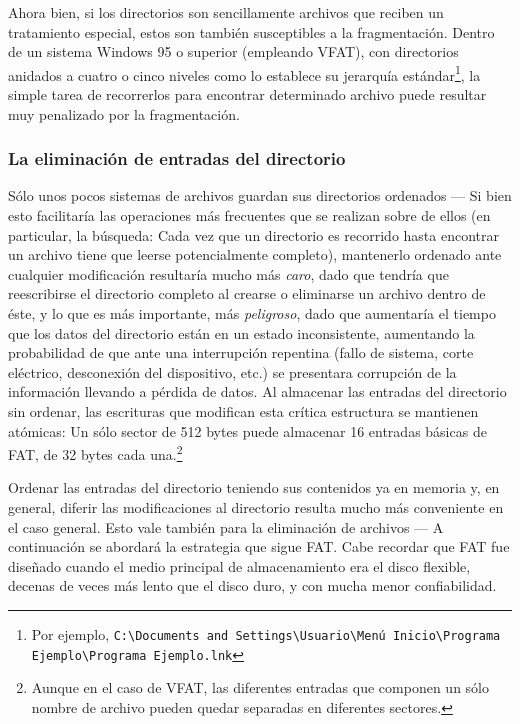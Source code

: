 \documentclass[11pt,fleqn]{book} %
\begin{document}
Ahora bien, si los directorios son sencillamente archivos que reciben
un tratamiento especial, estos son también susceptibles a la
fragmentación. Dentro de un sistema Windows 95 o superior (empleando
VFAT), con directorios anidados a cuatro o cinco niveles como lo
establece su jerarquía estándar\footnote{Por ejemplo, \texttt{C:\textbackslash{}Documents and
Settings\textbackslash{}Usuario\textbackslash{}Menú Inicio\textbackslash{}Programa Ejemplo\textbackslash{}Programa Ejemplo.lnk} },
la simple tarea de recorrerlos para encontrar determinado archivo puede
resultar muy penalizado por la fragmentación.
\subsubsection{La eliminación de entradas del directorio}
\label{sec-7-1-4-3}


Sólo unos pocos sistemas de archivos guardan sus directorios ordenados
— Si bien esto facilitaría las operaciones más frecuentes que se
realizan sobre de ellos (en particular, la búsqueda: Cada vez que un
directorio es recorrido hasta encontrar un archivo tiene que leerse
potencialmente completo), mantenerlo ordenado ante cualquier
modificación resultaría mucho más \emph{caro}, dado que tendría que
reescribirse el directorio completo al crearse o eliminarse un archivo
dentro de éste, y lo que es más importante, más \emph{peligroso}, dado que
aumentaría el tiempo que los datos del directorio están en un estado
inconsistente, aumentando la probabilidad de que ante una interrupción
repentina (fallo de sistema, corte eléctrico, desconexión del
dispositivo, etc.) se presentara corrupción de la información llevando
a pérdida de datos. Al almacenar las entradas del directorio sin
ordenar, las escrituras que modifican esta crítica estructura se
mantienen atómicas: Un sólo sector de 512 bytes puede almacenar 16
entradas básicas de FAT, de 32 bytes cada una.\footnote{Aunque en el caso
de VFAT, las diferentes entradas que componen un sólo nombre de
archivo pueden quedar separadas en diferentes sectores. }

Ordenar las entradas del directorio teniendo sus contenidos ya en
memoria y, en general, diferir las modificaciones al directorio
resulta mucho más conveniente en el caso general. Esto vale también
para la eliminación de archivos — A continuación se abordará la
estrategia que sigue FAT. Cabe recordar que FAT fue diseñado cuando el
medio principal de almacenamiento era el disco flexible, decenas de
veces más lento que el disco duro, y con mucha menor confiabilidad.
\end{document}
